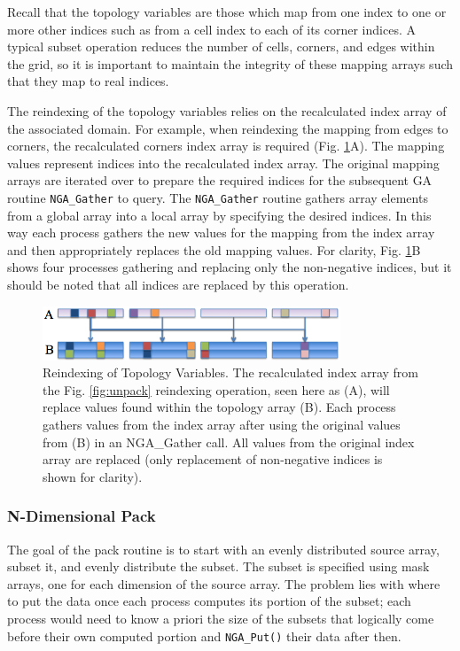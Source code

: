 Recall that the topology variables are those which map from one index to
one or more other indices such as from a cell index to each of its corner
indices.  A typical subset operation reduces the number of cells, corners, and
edges within the grid, so it is important to maintain the integrity of these
mapping arrays such that they map to real indices.

The reindexing of the topology variables relies on the recalculated index
array of the associated domain.  For example, when reindexing the mapping from
edges to corners, the recalculated corners index array is required (Fig.
\ref{fig:reindex}A).  The mapping values represent indices into the
recalculated index array.  The original mapping arrays are iterated over to
prepare the required indices for the subsequent GA routine \verb=NGA_Gather=
to query.  The \verb=NGA_Gather= routine gathers array elements from a global
array into a local array by specifying the desired indices.  In this way each
process gathers the new values for the mapping from the index array and then
appropriately replaces the old mapping values.  For clarity, Fig.
\ref{fig:reindex}B shows four processes gathering and replacing only the
non-negative indices, but it should be noted that all indices are replaced by
this operation.

\begin{figure}[!t]
\center
\includegraphics[width=3.5in]{images/reindex2}
\caption{Reindexing of Topology Variables.  The recalculated index array from
the Fig. \ref{fig:unpack} reindexing operation, seen here as (A), will replace
values found within the topology array (B).  Each process gathers values from
the index array after using the original values from (B) in an NGA\_Gather
call.  All values from the original index array are replaced (only replacement
of non-negative indices is shown for clarity).}
\label{fig:reindex}
\end{figure}

\subsubsection{N-Dimensional Pack}
\label{section:alg_pack}

The goal of the pack routine is to start with an evenly distributed source
array, subset it, and evenly distribute the subset.  The subset is specified
using mask arrays, one for each dimension of the source array.  The problem
lies with where to put the data once each process computes its portion of the
subset; each process would need to know a priori the size of the subsets that
logically come before their own computed portion and \verb=NGA_Put()= their
data after then.

